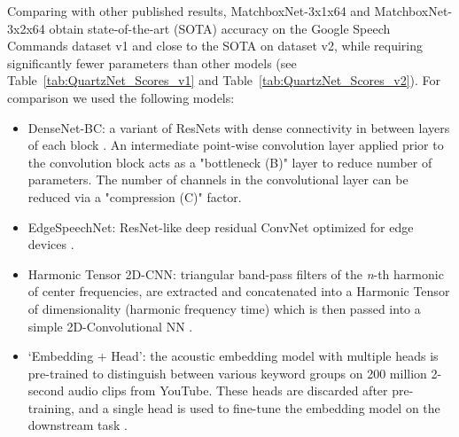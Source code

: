 \documentclass[a4paper]{article}
\begin{document}
Comparing with other published results, MatchboxNet-3x1x64 and MatchboxNet-3x2x64 obtain state-of-the-art (SOTA) accuracy on the Google Speech Commands dataset v1 and close to the SOTA on dataset v2, while requiring significantly fewer parameters than other models 
(see Table~\ref{tab:QuartzNet_Scores_v1} and Table~\ref{tab:QuartzNet_Scores_v2}).
For comparison we used the following models:
\begin{itemize}
    \item DenseNet-BC: a variant of ResNets with dense connectivity in between layers of each block \cite{huang2016}. An intermediate point-wise convolution layer applied prior to the convolution block acts as a "bottleneck (B)" layer to reduce number of parameters. The number of channels in the convolutional layer can be reduced via a "compression (C)" factor.
    \item EdgeSpeechNet: ResNet-like deep residual ConvNet  optimized for edge devices \cite{lin2018edgespeechnets}.
    \item Harmonic Tensor 2D-CNN: triangular band-pass filters of the \textit{n}-th harmonic of center frequencies, are extracted and concatenated into a Harmonic Tensor of dimensionality  (harmonic  frequency  time) which is then passed into a simple 2D-Convolutional NN \cite{won2020harmonic}.
    \item `Embedding + Head': the acoustic embedding model with multiple heads is pre-trained to distinguish between various keyword groups on 200 million 2-second audio clips from YouTube. These heads are discarded after pre-training, and a single head is used to fine-tune the embedding model on the downstream task \cite{lin2020training}.
\end{itemize}

{\renewcommand{\arraystretch}{1.1}
\begin{table}[!h]
\caption{MatchboxNet on Google Speech Commands dataset v1, the accuracy is averaged over 5 trials (95\% Confidence Interval).}
\label{tab:QuartzNet_Scores_v1}
\centering
{}
\end{table}
}
\end{document}
